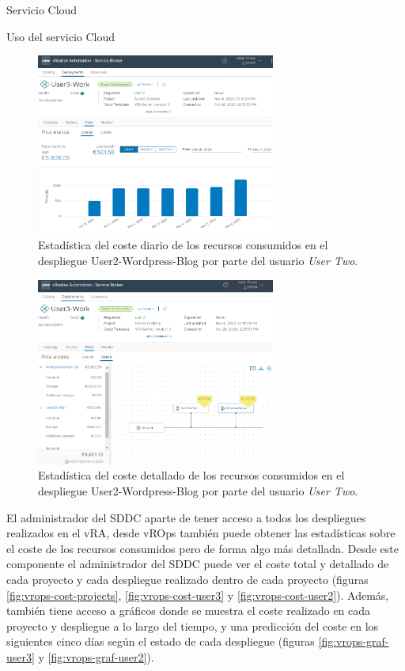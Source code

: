 \begin{subsection}{Servicio Cloud}
\begin{subsubsection}{Uso del servicio Cloud}
        \begin{figure}[h]
            \centering
            \includegraphics[width=0.7\textwidth]{imaxes/pruebaconcepto/vrealize/price-user3-work.png}
            \caption{Estadística del coste diario de los recursos consumidos en el despliegue User2-Wordpress-Blog por parte del usuario \textit{User Two}.}
            \label{fig:user2-daily-price}
        \end{figure}
        \FloatBarrier
        \begin{figure}[h]
            \centering
            \includegraphics[width=0.7\textwidth]{imaxes/pruebaconcepto/vrealize/user3-price-details.png}
            \caption{Estadística del coste detallado de los recursos consumidos en el despliegue User2-Wordpress-Blog por parte del usuario \textit{User Two}.}
            \label{fig:user2-detail-price}
        \end{figure}
        \FloatBarrier
        El administrador del SDDC aparte de tener acceso a todos los despliegues realizados en el vRA, desde vROps también puede obtener las estadísticas sobre el coste de los recursos consumidos pero de forma algo más detallada. Desde este componente el administrador del SDDC puede ver el coste total y detallado de cada proyecto y cada despliegue realizado dentro de cada proyecto (figuras \ref{fig:vrops-cost-projects}, \ref{fig:vrops-cost-user3} y \ref{fig:vrops-cost-user2}). Además, también tiene acceso a gráficos donde se muestra el coste realizado en cada proyecto y despliegue a lo largo del tiempo, y una predicción del coste en los siguientes cinco días según el estado de cada despliegue (figuras \ref{fig:vrops-graf-user3} y \ref{fig:vrops-graf-user2}).

\end{subsubsection}
\end{subsection}
